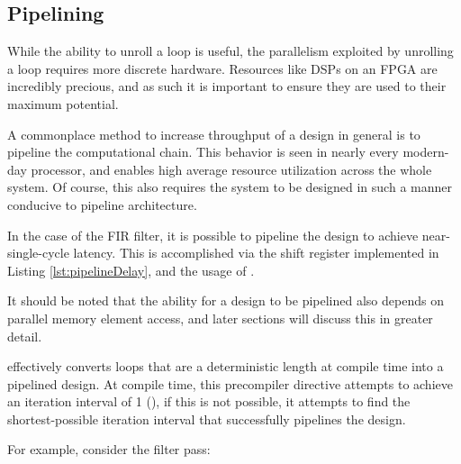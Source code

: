 \documentclass[11pt]{report}
\begin{document}
\begin{singlespace}
    
\end{singlespace}

\subsection{Pipelining}

While the ability to unroll a loop is useful, the parallelism exploited by unrolling a loop requires more discrete hardware. Resources like DSPs on an FPGA are incredibly precious, and as such it is important to ensure they are used to their maximum potential.

A commonplace method to increase throughput of a design in general is to pipeline the computational chain. This behavior is seen in nearly every modern-day processor, and enables high average resource utilization across the whole system. Of course, this also requires the system to be designed in such a manner conducive to pipeline architecture.

In the case of the FIR filter, it is possible to pipeline the design to achieve near-single-cycle latency. This is accomplished via the shift register implemented in Listing \ref{lst:pipelineDelay}, and the usage of . 

It should be noted that the ability for a design to be pipelined also depends on parallel memory element access, and later sections will discuss this in greater detail.

 effectively converts loops that are a deterministic length at compile time into a pipelined design. At compile time, this precompiler directive attempts to achieve an iteration interval of 1 (), if this is not possible, it attempts to find the shortest-possible iteration interval that successfully pipelines the design. 

For example, consider the filter pass:

\begin{singlespace}
    
\end{singlespace}
\end{document}
